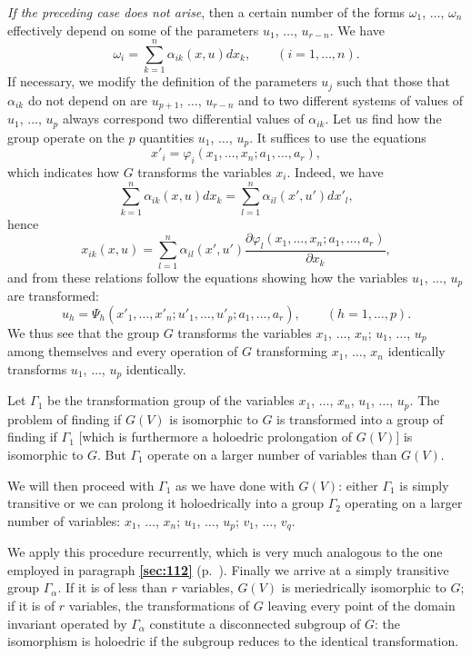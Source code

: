 \documentclass[leqno,11pt]{book}
\makeatletter
\numberwithin{equation}{chapter}
\newcommand{\pd}{\partial}
\theoremstyle{shape1}
\theoremstyle{shapesmall}
\let\old@phi\phi
\let\old@varphi\varphi
\let\phi\old@varphi
\let\varphi\old@phi
\newcommand{\fsref}[1]{{\rm\textsection\textbf{\ref{sec:#1}}}}
\makeatother
\begin{document}
\emph{If the preceding case does not arise}, then a certain number of the forms $\omega_{1}$, $\dots$, $\omega_{n}$ effectively depend on some of the parameters $u_{1}$, $\dots$, $u_{r-n}$. We have
\[
\omega_{i}=\sum_{k=1}^{n}\alpha_{ik}(x,u)dx_{k},\qquad(i=1,\dots,n).
\]
If necessary, we modify the definition of the parameters $u_{j}$ such that those that $\alpha_{ik}$ do not depend on are $u_{p+1}$, $\dots$, $u_{r-n}$ and to two different systems of values of $u_{1}$, $\dots$, $u_{p}$ always correspond two differential values of $\alpha_{ik}$. Let us find how the group operate on the $p$ quantities $u_{1}$, $\dots$, $u_{p}$. It suffices to use the equations
\begin{equation}
  \label{eq:9.2}
  x'_{i}=\phi_{i}(x_{1},\dots,x_{n};a_{1},\dots,a_{r}),
\end{equation}
which indicates how $G$ transforms the variables $x_{i}$. Indeed, we have
\[
\sum_{k=1}^{n}\alpha_{ik}(x,u)dx_{k}=\sum_{l=1}^{n}\alpha_{il}(x',u')dx'_{l},
\]
hence
\[
x_{ik}(x,u)=\sum_{l=1}^{n}\alpha_{il}(x',u')\frac{\pd \phi_{l}(x_{1},\dots,x_{n};a_{1},\dots,a_{r})}{\pd x_{k}},
\]
and from these relations follow the equations showing how the variables $u_{1}$, $\dots$, $u_{p}$ are transformed:
\begin{equation}
  \label{eq:9.3}
  u_{h}=\Psi_{h}(x'_{1},\dots,x'_{n};u'_{1},\dots,u'_{p};a_{1},\dots,a_{r}),\qquad(h=1,\dots,p).
\end{equation}
We thus see that the group $G$ transforms the variables $x_{1}$, $\dots$, $x_{n}$; $u_1$, $\dots$, $u_{p}$ among themselves and every operation of $G$ transforming $x_{1}$, $\dots$, $x_{n}$ identically transforms $u_{1}$, $\dots$, $u_{p}$ identically.

Let $\Gamma_{1}$ be the transformation group of the variables $x_{1}$, $\dots$, $x_{n}$, $u_{1}$, $\dots$, $u_{p}$. The problem of finding if $G(V)$ is isomorphic to $G$ is transformed into a group of finding if $\Gamma_{1}$ [which is furthermore a holoedric prolongation of $G(V)$] is isomorphic to $G$. But $\Gamma_{1}$ operate on a larger number of variables than $G(V)$.

We will then proceed with $\Gamma_{1}$ as we have done with $G(V)$: either $\Gamma_{1}$ is simply transitive or we can prolong it holoedrically into a group $\Gamma_{2}$ operating on a larger number of variables: $x_{1}$, $\dots$, $x_{n}$; $u_{1}$, $\dots$, $u_{p}$; $v_{1}$, $\dots$, $v_{q}$.

We apply this procedure recurrently, which is very much analogous to the one employed in paragraph \fsref{112} (p.~\pageref{sec:112}). Finally we arrive at a simply transitive group $\Gamma_{\alpha}$. If it is of less than $r$ variables, $G(V)$ is meriedrically isomorphic to $G$; if it is of $r$ variables, the transformations of $G$ leaving every point of the domain invariant operated by $\Gamma_{\alpha}$ constitute a disconnected subgroup of $G$: the isomorphism is holoedric if the subgroup reduces to the identical transformation.
\end{document}

